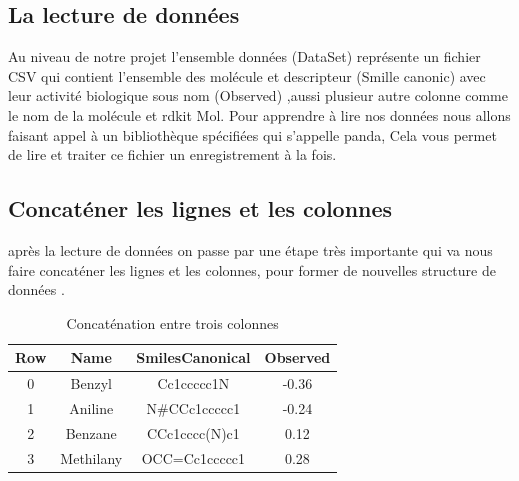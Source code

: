 \documentclass[12pt]{report}
\begin{document}
\subsection{La lecture de données}
Au niveau de notre projet l'ensemble données (DataSet) représente un fichier CSV qui contient l'ensemble des molécule et descripteur (Smille canonic) avec leur activité biologique sous nom (Observed) ,aussi plusieur autre colonne comme le nom de la molécule et rdkit Mol.
Pour apprendre à lire nos données nous allons faisant appel à un bibliothèque spécifiées qui s'appelle panda, Cela vous permet de lire et traiter ce fichier un enregistrement à la fois.

\newpage
\subsection{Concaténer les lignes et les colonnes}
après la lecture de données on passe par une étape très importante qui va nous faire concaténer les lignes et les colonnes, pour former de nouvelles structure de données \cite{ref25}.\\
\begin{table}[h]
\begin{center}
\begin{tabular}{|c|c|c|c|}
\hline
Row & Name & SmilesCanonical & Observed \\
\hline 
0 & Benzyl & Cc1ccccc1N & -0.36\\
1 & Aniline & N#CCc1ccccc1 & -0.24\\
2 & Benzane & CCc1cccc(N)c1 & 0.12\\
3 & Methilany & OCC=Cc1ccccc1 & 0.28\\
\hline
\end{tabular}
\caption{Concaténation entre trois colonnes}
\end{center}
\end{table}
\end{document}
